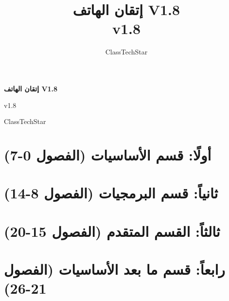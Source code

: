 \documentclass[11pt,a4paper,openany]{book}
\title{إتقان الهاتف V1.8\\ \large v1.8}
\author{ClassTechStar}
\date{}
\begin{document}
\begin{titlepage}
\centering
\vspace*{0.28\textheight}
{\Huge\bfseries إتقان الهاتف V1.8\par}
\vspace{1.2em}
{\Large v1.8\par}
\vfill
{\large ClassTechStar\par}
\end{titlepage}
\frontmatter
\tableofcontents
\mainmatter
\part*{أولًا: قسم الأساسيات (الفصول 0-7)}










\part*{ثانياً: قسم البرمجيات (الفصول 8-14)}








\part*{ثالثاً: القسم المتقدم (الفصول 15-20)}







\part*{رابعاً: قسم ما بعد الأساسيات (الفصول 21-26)}







\end{document}
